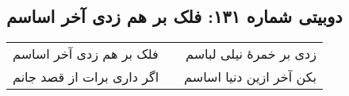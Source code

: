 \begin{center}
\section*{دوبیتی شماره ۱۳۱: فلک بر هم زدی آخر اساسم}
\label{sec:131}
\begin{longtable}{l p{0.5cm} r}
فلک بر هم زدی آخر اساسم
&&
زدی بر خمرهٔ نیلی لباسم
\\
اگر داری برات از قصد جانم
&&
بکن آخر ازین دنیا اساسم
\\
\end{longtable}
\end{center}
